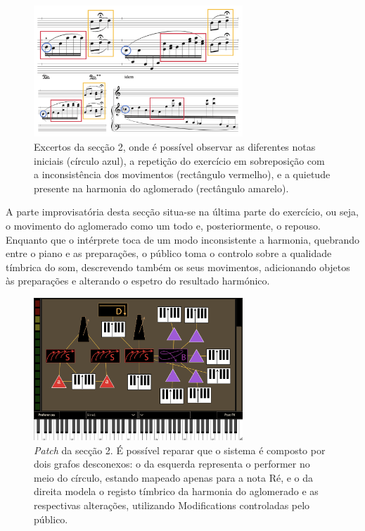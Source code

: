 \documentclass[../main.tex]{subfiles}
\begin{document}
\begin{figure}[h]
    \centering
    \captionsetup{width=0.8\textwidth}
    \includegraphics[width=0.7\textwidth]{images/obra2.png}
    \caption{Excertos da secção 2, onde é possível observar as diferentes notas iniciais (círculo azul), a repetição do exercício em sobreposição com a inconsistência dos movimentos (rectângulo vermelho), e a quietude presente na harmonia do aglomerado (rectângulo amarelo).}
    \label{fig:obra2}
\end{figure}

A parte improvisatória desta secção situa-se na última parte do exercício, ou seja, o movimento do aglomerado como um todo e, posteriormente, o repouso. Enquanto que o intérprete toca de um modo inconsistente a harmonia, quebrando entre o piano e as preparações, o público toma o controlo sobre a qualidade tímbrica do som, descrevendo também os seus movimentos, adicionando objetos às preparações e alterando o espetro do resultado harmónico.

\begin{figure}[h]
    \centering
    \captionsetup{width=0.8\textwidth}
    \includegraphics[width=0.7\textwidth]{images/bit2.png}
    \caption{\textsl{Patch} da secção 2. É possível reparar que o sistema é composto por dois grafos desconexos: o da esquerda representa o performer no meio do círculo, estando mapeado apenas para a nota Ré, e o da direita modela o registo tímbrico da harmonia do aglomerado e as respectivas alterações, utilizando Modifications controladas pelo público.}
    \label{fig:bit2}
\end{figure}
\end{document}
